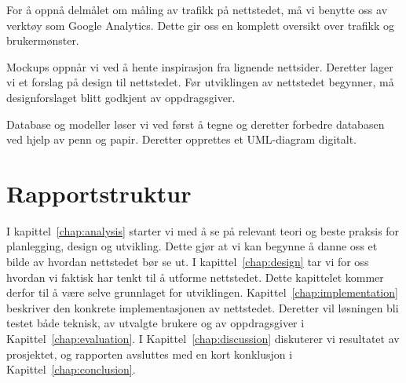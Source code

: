 For å oppnå delmålet om måling av trafikk på nettstedet, må vi benytte oss av verktøy som Google Analytics. Dette gir oss en komplett oversikt over trafikk og brukermønster.

Mockups oppnår vi ved å hente inspirasjon fra lignende nettsider. Deretter lager vi et forslag på design til nettstedet. Før utviklingen av nettstedet begynner, må designforslaget blitt godkjent av oppdragsgiver.

Database og modeller løser vi ved først å tegne og deretter forbedre databasen ved hjelp av penn og papir. Deretter opprettes et UML-diagram digitalt.

\section{Rapportstruktur}



I kapittel~\ref{chap:analysis} starter vi med å se på relevant teori og beste praksis for planlegging, design og utvikling. Dette gjør at vi kan begynne å danne oss et bilde av hvordan nettstedet bør se ut. I kapittel~\ref{chap:design} tar vi for oss hvordan vi faktisk har tenkt til å utforme nettstedet. Dette kapittelet kommer derfor til å være selve grunnlaget for utviklingen. Kapittel~\ref{chap:implementation} beskriver den konkrete implementasjonen av nettstedet. Deretter vil løsningen bli testet både teknisk, av utvalgte brukere og av oppdragsgiver i Kapittel~\ref{chap:evaluation}. I Kapittel~\ref{chap:discussion} diskuterer vi resultatet av prosjektet, og rapporten avsluttes med en kort konklusjon i Kapittel~\ref{chap:conclusion}.
